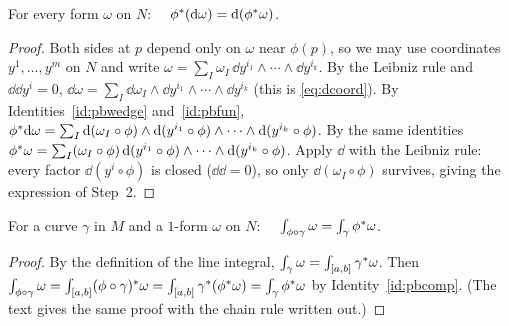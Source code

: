 \begin{identity}\label{id:pbd}
For every form $\omega$ on $N$: $\quad\phi{}^{*}(\mathrm{d}\omega)=\mathrm{d}(\phi{}^{*}\omega)$.
\end{identity}
\begin{proof}
 Both sides at $p$ depend only on $\omega$ near $\phi(p)$, so we may use coordinates $y^1,\dots,y^m$ on $N$ and write
$\omega=\sum_I\omega_I\,\dd y^{i_1}\wedge\cdots\wedge\dd y^{i_k}$.
 By the Leibniz rule and $\dd\dd y^i=0$, $\dd\omega=\sum_I\dd\omega_I\wedge\dd y^{i_1}\wedge\cdots\wedge\dd y^{i_k}$
(this is \eqref{eq:dcoord}). By Identities~\ref{id:pbwedge} and~\ref{id:pbfun},
$\phi{}^{*}\mathrm{d}\omega=\sum_I\mathrm{d}(\omega_I\circ\phi)\wedge\mathrm{d}(y^{i_1}\circ\phi)\wedge\cdots\wedge\mathrm{d}(y^{i_k}\circ\phi)$.
 By the same identities $\phi{}^{*}\omega=\sum_I(\omega_I\circ\phi)\,\mathrm{d}(y^{i_1}\circ\phi)\wedge\cdots\wedge\mathrm{d}(y^{i_k}\circ\phi)$.
Apply $\dd$ with the Leibniz rule: every factor $\dd(y^{i}\circ\phi)$ is closed ($\dd\dd=0$), so only $\dd(\omega_I\circ\phi)$ survives,
giving the expression of Step~2.
\end{proof}

\begin{identity}\label{id:natural}
For a curve $\gamma$ in $M$ and a $1$-form $\omega$ on $N$: $\quad\int_{\phi\circ\gamma}\omega=\int_\gamma\phi{}^{*}\omega$.
\end{identity}
\begin{proof}
By the definition of the line integral, $\int_\gamma\omega=\int_{[a,b]}\gamma{}^{*}\omega$. Then
$\int_{\phi\circ\gamma}\omega=\int_{[a,b]}(\phi\circ\gamma){}^{*}\omega=\int_{[a,b]}\gamma{}^{*}(\phi{}^{*}\omega)=\int_\gamma\phi{}^{*}\omega$
by Identity~\ref{id:pbcomp}. (The text gives the same proof with the chain rule written out.)
\end{proof}
